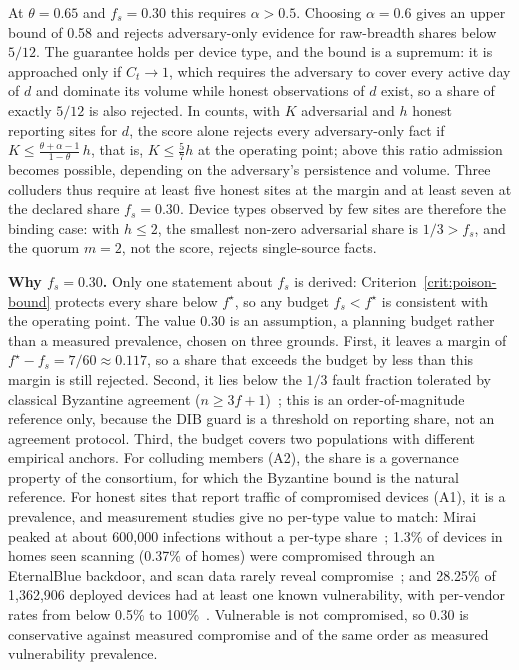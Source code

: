 \documentclass[journal]{IEEEtran}
\theoremstyle{definition}
\begin{document}
At $\theta=0.65$ and $f_s=0.30$ this requires $\alpha>0.5$. Choosing $\alpha=0.6$ gives an upper bound of 0.58 and rejects adversary-only evidence for raw-breadth shares below $5/12$. The guarantee holds per device type, and the bound is a supremum: it is approached only if $C_t\to1$, which requires the adversary to cover every active day of $d$ and dominate its volume while honest observations of $d$ exist, so a share of exactly $5/12$ is also rejected. In counts, with $K$ adversarial and $h$ honest reporting sites for $d$, the score alone rejects every adversary-only fact if $K\le\frac{\theta+\alpha-1}{1-\theta}\,h$, that is, $K\le\frac57h$ at the operating point; above this ratio admission becomes possible, depending on the adversary's persistence and volume. Three colluders thus require at least five honest sites at the margin and at least seven at the declared share $f_s=0.30$. Device types observed by few sites are therefore the binding case: with $h\le2$, the smallest non-zero adversarial share is $1/3>f_s$, and the quorum $m=2$, not the score, rejects single-source facts.

\textbf{Why $f_s=0.30$.} Only one statement about $f_s$ is derived: Criterion~\ref{crit:poison-bound} protects every share below $f^\star$, so any budget $f_s<f^\star$ is consistent with the operating point. The value $0.30$ is an assumption, a planning budget rather than a measured prevalence, chosen on three grounds. First, it leaves a margin of $f^\star-f_s=7/60\approx0.117$, so a share that exceeds the budget by less than this margin is still rejected. Second, it lies below the $1/3$ fault fraction tolerated by classical Byzantine agreement ($n\ge3f+1$)~\cite{lamport1982byzantine,castro1999pbft}; this is an order-of-magnitude reference only, because the DIB guard is a threshold on reporting share, not an agreement protocol. Third, the budget covers two populations with different empirical anchors. For colluding members (A2), the share is a governance property of the consortium, for which the Byzantine bound is the natural reference. For honest sites that report traffic of compromised devices (A1), it is a prevalence, and measurement studies give no per-type value to match: Mirai peaked at about 600{,}000 infections without a per-type share~\cite{mirai}; 1.3\% of devices in homes seen scanning (0.37\% of homes) were compromised through an EternalBlue backdoor, and scan data rarely reveal compromise~\cite{kumar2019allthings}; and 28.25\% of 1{,}362{,}906 deployed devices had at least one known vulnerability, with per-vendor rates from below 0.5\% to 100\%~\cite{zhao2022largescale}. Vulnerable is not compromised, so $0.30$ is conservative against measured compromise and of the same order as measured vulnerability prevalence.
\end{document}

